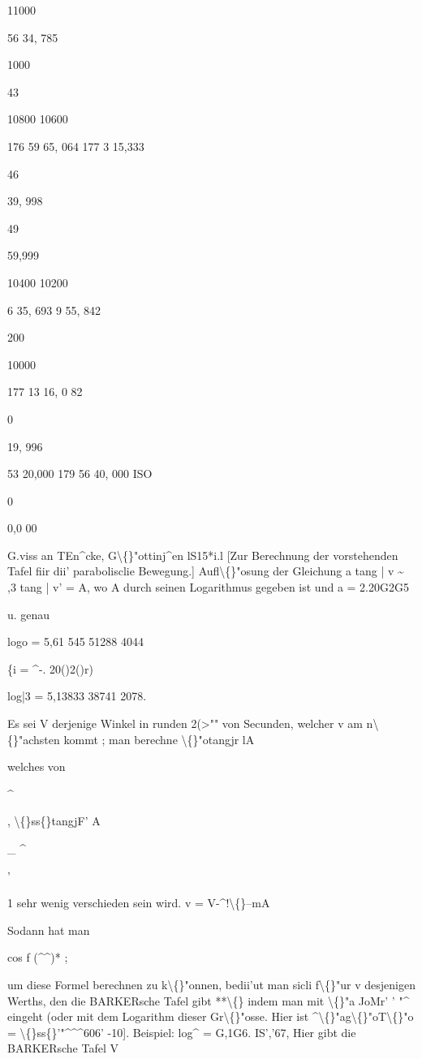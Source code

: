 \documentclass[10pt,a4paper]{article}
\begin{document}
11000

56 34, 785

1000

43

10800
10600

176 59 65, 064
177
3 15,333


46

39, 998

49

59,999

10400
10200

6 35, 693
9 55, 842

200

10000

177 13 16, 0 82

0

19, 996

53 20,000
179 56 40, 000
ISO

0

0,0 00

\newpage

G.viss an TEn\textasciicircum{}cke, G\textbackslash\{\}"ottinj\textasciicircum{}en lS15*i.l
[Zur Berechnung der vorstehenden Tafel fiir dii' parabolisclie Bewegung.]
Aufl\textbackslash\{\}"osung der Gleichung
a tang | v \textasciitilde{} ,3 tang | v' = A,
wo A durch seinen Logarithmus gegeben ist und
a = 2.20G2G5

u. genau

logo = 5,61 545 51288 4044

\{i = \textasciicircum{}-. 20()2()r)

log|3 = 5,13833 38741 2078.

Es sei V derjenige Winkel in runden 2(>"" von Secunden, welcher v am
n\textbackslash\{\}"achsten kommt ; man berechne
\textbackslash\{\}"otangjr
lA

welches von

\textasciicircum{}

, \textbackslash\{\}ss\{\}tangjF'
A

\_
\textasciicircum{}

'

1 sehr wenig verschieden sein wird.
v = V-\textasciicircum{}!\textbackslash\{\}--mA

Sodann hat man

cos f (\textasciicircum{}\textasciicircum{})* ;

um diese Formel berechnen zu k\textbackslash\{\}"onnen, bedii'ut man sicli f\textbackslash\{\}"ur v desjenigen
Werths, den die BARKERsche Tafel gibt **\textbackslash\{\} indem man mit \textbackslash\{\}"a JoMr' ' "\textasciicircum{} eingeht
(oder mit dem Logarithm dieser Gr\textbackslash\{\}"osse.
Hier ist
\textasciicircum{}\textbackslash\{\}"ag\textbackslash\{\}"oT\textbackslash\{\}"o = \textbackslash\{\}ss\{\}'"\textasciicircum{}\textasciicircum{}\textasciicircum{}606' -10].
Beispiel: log\textasciicircum{} = G,1G6.
IS','67,
Hier gibt die BARKERsche Tafel
V
\end{document}
